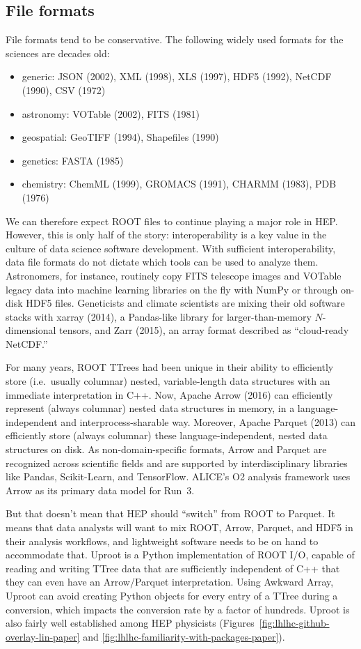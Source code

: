 \documentclass{article}
\begin{document}
\subsection{File formats}

File formats tend to be conservative. The following widely used formats for the sciences are decades old:

\begin{itemize}
\item generic: JSON (2002), XML (1998), XLS (1997), HDF5 (1992), NetCDF (1990), CSV (1972)
\item astronomy: VOTable (2002), FITS (1981)
\item geospatial: GeoTIFF (1994), Shapefiles (1990)
\item genetics: FASTA (1985)
\item chemistry: ChemML (1999), GROMACS (1991), CHARMM (1983), PDB (1976)
\end{itemize}

We can therefore expect ROOT files to continue playing a major role in HEP. However, this is only half of the story: interoperability is a key value in the culture of data science software development. With sufficient interoperability, data file formats do not dictate which tools can be used to analyze them. Astronomers, for instance, routinely copy FITS telescope images and VOTable legacy data into machine learning libraries on the fly with NumPy or through on-disk HDF5 files. Geneticists and climate scientists are mixing their old software stacks with xarray (2014), a Pandas-like library for larger-than-memory $N$-dimensional tensors, and Zarr (2015), an array format described as ``cloud-ready NetCDF.''

For many years, ROOT TTrees had been unique in their ability to efficiently store (i.e.\ usually columnar) nested, variable-length data structures with an immediate interpretation in C++. Now, Apache Arrow (2016) can efficiently represent (always columnar) nested data structures in memory, in a language-independent and interprocess-sharable way. Moreover, Apache Parquet (2013) can efficiently store (always columnar) these language-independent, nested data structures on disk. As non-domain-specific formats, Arrow and Parquet are recognized across scientific fields and are supported by interdisciplinary libraries like Pandas, Scikit-Learn, and TensorFlow. ALICE's O2 analysis framework uses Arrow as its primary data model for Run~3.

But that doesn't mean that HEP should ``switch'' from ROOT to Parquet. It means that data analysts will want to mix ROOT, Arrow, Parquet, and HDF5 in their analysis workflows, and lightweight software needs to be on hand to accommodate that. Uproot is a Python implementation of ROOT I/O, capable of reading and writing TTree data that are sufficiently independent of C++ that they can even have an Arrow/Parquet interpretation. Using Awkward Array, Uproot can avoid creating Python objects for every entry of a TTree during a conversion, which impacts the conversion rate by a factor of hundreds. Uproot is also fairly well established among HEP physicists (Figures~\ref{fig:lhlhc-github-overlay-lin-paper} and \ref{fig:lhlhc-familiarity-with-packages-paper}).
\end{document}
